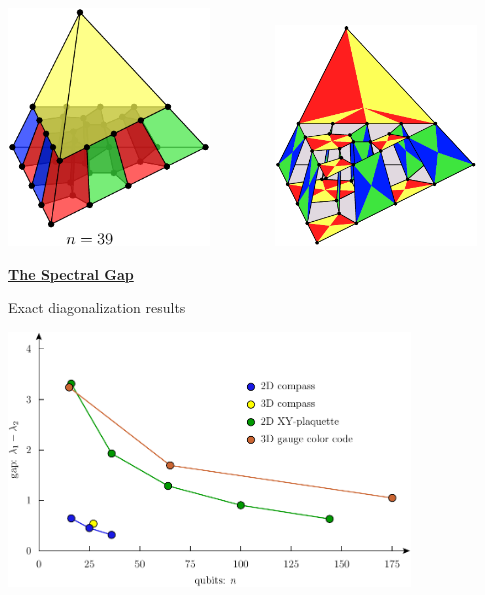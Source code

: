 \documentclass[11pt]{article}
\def\heading #1{\centerline{\underline{\bf\LARGE #1}}}
\def\hsp {\ \ \ \ }
\begin{document}
\includegraphics[width=0.4\textwidth]{pic-gcolor-15.pdf}
\hsp\hsp
\includegraphics[width=0.4\textwidth]{pic-gcolor-ideal.pdf}

\rightline{[Burton2018]}

\newpage %

\heading{The Spectral Gap}

Exact diagonalization results
\begin{center}
\includegraphics[width=0.8\textwidth]{pic-gap.pdf}
\end{center}

\vspace*{-0.4cm}
\rightline{[Burton2018]}
\end{document}
